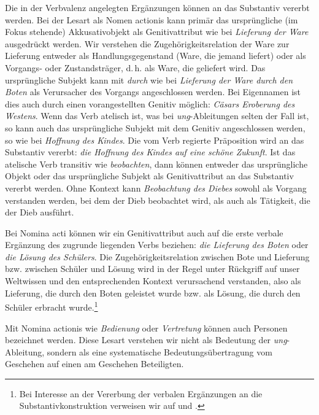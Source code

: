 Die in der Verbvalenz angelegten Ergänzungen können an das Substantiv vererbt werden. Bei der Lesart als Nomen actionis kann primär das ursprüngliche (im Fokus stehende) Akkusativobjekt als Genitivattribut wie bei \textit{Lieferung der Ware} ausgedrückt werden. Wir verstehen die Zugehörigkeitsrelation der Ware zur Lieferung entweder als Handlungsgegenstand (Ware, die jemand liefert) oder als Vorgangs- oder Zustandsträger, d.\,h. als Ware, die geliefert wird. Das ursprüngliche Subjekt kann mit \textit{durch} wie bei \textit{Lieferung der Ware durch den Boten} als Verursacher des Vorgangs angeschlossen werden. Bei Eigennamen ist dies auch durch einen vorangestellten Genitiv möglich: \textit{Cäsars Eroberung des Westens}. Wenn das Verb atelisch ist, was bei \textit{ung}-Ableitungen selten der Fall ist, so kann auch das ursprüngliche Subjekt mit dem Genitiv angeschlossen werden, so wie bei \textit{Hoffnung des Kindes}. Die vom Verb regierte Präposition wird an das Substantiv vererbt: \textit{die Hoffnung des Kindes auf eine schöne Zukunft}. Ist das atelische Verb transitiv wie \textit{beobachten}, dann können entweder das ursprüngliche Objekt oder das ursprüngliche Subjekt als Genitivattribut an das Substantiv vererbt werden. Ohne Kontext kann \textit{Beobachtung des Diebes} sowohl als Vorgang verstanden werden, bei dem der Dieb beobachtet wird, als auch als Tätigkeit, die der Dieb ausführt.   

Bei Nomina acti können wir ein Genitivattribut auch auf die erste verbale Ergänzung des zugrunde liegenden Verbs beziehen: \textit{die Lieferung des Boten} oder \textit{die Lösung des Schülers}. Die Zugehörigkeitsrelation zwischen Bote und Lieferung bzw. zwischen Schüler und Lösung wird in der Regel unter Rückgriff auf unser Weltwissen und den entsprechenden Kontext verursachend verstanden, also als Lieferung, die durch den Boten geleistet wurde bzw. als Lösung, die durch den Schüler erbracht wurde.\footnote{Bei Interesse an der Vererbung der verbalen Ergänzungen an die Substantivkonstruktion verweisen wir auf \citet{Eichinger1995} und \citet{Welke2016}.}

Mit Nomina actionis wie \textit{Bedienung} oder \textit{Vertretung} können auch Personen bezeichnet werden. Diese Lesart verstehen wir nicht als Bedeutung der \textit{ung}-Ableitung, sondern als eine systematische Bedeutungsübertragung vom Geschehen auf einen am Geschehen Beteiligten.

\label{subsubsection:erei}

